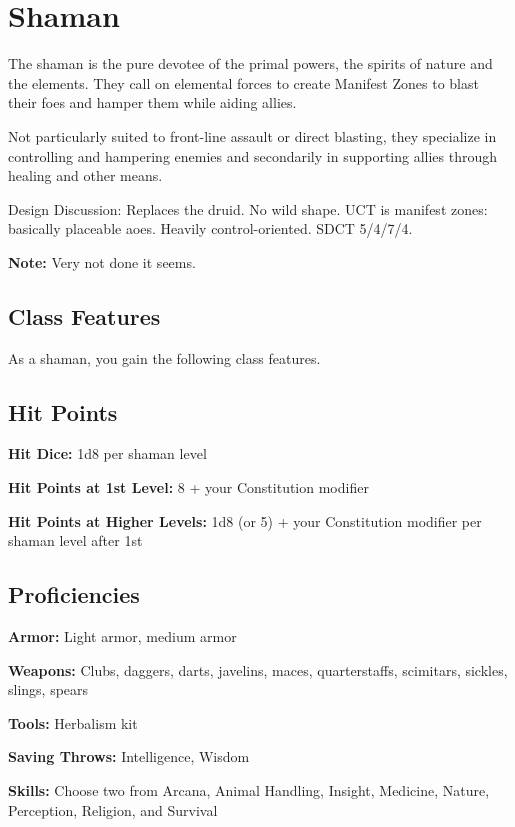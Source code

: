 \section{Shaman\label{class:shaman}}

The shaman is the pure devotee of the primal powers, the spirits of nature and the elements. They call on elemental forces to create Manifest Zones to blast their foes and hamper them while aiding allies.

Not particularly suited to front-line assault or direct blasting, they specialize in controlling and hampering enemies and secondarily in supporting allies through healing and other means.

Design Discussion: Replaces the druid. No wild shape. UCT is manifest zones: basically placeable aoes. Heavily control-oriented. SDCT 5/4/7/4.

\textbf{Note:} Very not done it seems.

\subsection{Class Features}

As a shaman, you gain the following class features.

\subsection{Hit Points}

\textbf{Hit Dice:} 1d8 per shaman level

\textbf{Hit Points at 1st Level:} 8 + your Constitution modifier

\textbf{Hit Points at Higher Levels:} 1d8 (or 5) + your Constitution modifier per shaman level after 1st

\subsection{Proficiencies}

\textbf{Armor:} Light armor, medium armor

\textbf{Weapons:} Clubs, daggers, darts, javelins, maces, quarterstaffs, scimitars, sickles, slings, spears

\textbf{Tools:} Herbalism kit

\textbf{Saving Throws:} Intelligence, Wisdom

\textbf{Skills:} Choose two from Arcana, Animal Handling, Insight, Medicine, Nature, Perception, Religion, and Survival

